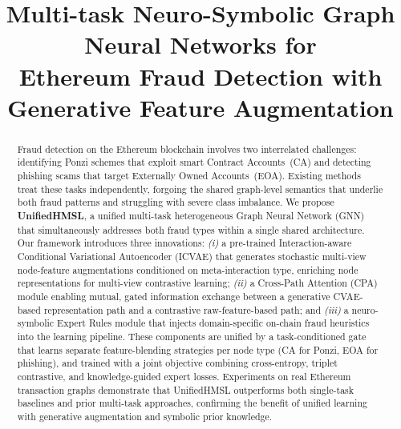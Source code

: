 \documentclass[conference]{IEEEtran}
\begin{document}
\title{Multi-task Neuro-Symbolic Graph Neural Networks for\\Ethereum Fraud Detection with Generative Feature Augmentation}

\author{
}

\maketitle

\begin{abstract}
Fraud detection on the Ethereum blockchain involves two interrelated
challenges: identifying Ponzi schemes that exploit smart Contract
Accounts~(CA) and detecting phishing scams that target Externally
Owned Accounts~(EOA). Existing methods treat these tasks
independently, forgoing the shared graph-level semantics that underlie
both fraud patterns and struggling with severe class imbalance.
We propose \textbf{UnifiedHMSL}, a unified multi-task heterogeneous
Graph Neural Network (GNN) that simultaneously addresses both fraud
types within a single shared architecture.
Our framework introduces three innovations:
\textit{(i)} a pre-trained Interaction-aware Conditional Variational
Autoencoder (ICVAE) that generates stochastic multi-view node-feature
augmentations conditioned on meta-interaction type, enriching node
representations for multi-view contrastive learning;
\textit{(ii)} a Cross-Path Attention (CPA) module enabling mutual,
gated information exchange between a generative CVAE-based
representation path and a contrastive raw-feature-based path; and
\textit{(iii)} a neuro-symbolic Expert Rules module that injects
domain-specific on-chain fraud heuristics into the learning pipeline.
These components are unified by a task-conditioned gate that learns
separate feature-blending strategies per node type (CA for Ponzi,
EOA for phishing), and trained with a joint objective combining
cross-entropy, triplet contrastive, and knowledge-guided expert losses.
Experiments on real Ethereum transaction graphs demonstrate that
UnifiedHMSL outperforms both single-task baselines and prior
multi-task approaches, confirming the benefit of unified learning with
generative augmentation and symbolic prior knowledge.
\end{abstract}
\end{document}
